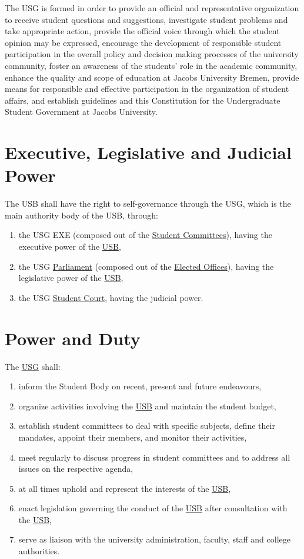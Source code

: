 The \ac{USG}\label{USGdef} is formed in order to provide an official and representative organization to receive student questions and suggestions, investigate student problems and take appropriate action, provide the official voice through which the student opinion may be expressed, encourage the development of responsible student participation in the overall policy and decision making processes of the university community, foster an awareness of the students' role in the academic community, enhance the quality and scope of education at Jacobs University Bremen, provide means for responsible and effective participation in the organization of student affairs, and establish guidelines and this Constitution for the Undergraduate Student Government at Jacobs University.


\section{Executive, Legislative and Judicial Power} 
The \acf{USB}\label{USBdef} shall have the right to self-governance through the \acf{USG}, which is the main authority body of the USB, through:
\begin{enumerate}
    \item the USG \acl{EXE} (composed out of the \hyperref[USGstructure]{Student Committees}), having the executive power of the \hyperref[studentbody]{USB},
    \item the USG \hyperref[USGParliamentDef]{Parliament} \label{USGParliament} (composed out of the \hyperref[ElectedOfficesDef]{Elected Offices}), having the legislative power of the \hyperref[studentbody]{USB},
    \item the USG \hyperref[StudentCourtDef]{Student Court}, having the judicial power.
\end{enumerate}


\section{Power and Duty}
The \hyperref[USGdef]{USG} shall: 
\begin{enumerate}
\item inform the Student Body on recent, present and future endeavours,
\item organize activities involving the \hyperref[studentbody]{USB} and maintain the student budget,
\item establish student committees to deal with specific subjects, define their mandates, appoint their members, and monitor their activities,
\item meet regularly to discuss progress in student committees and to address all issues on the respective agenda,
\item at all times uphold and represent the interests of the \hyperref[studentbody]{USB},
\item enact legislation governing the conduct of the \hyperref[studentbody]{USB} after consultation with the \hyperref[studentbody]{USB},
\item serve as liaison with the university administration, faculty, staff and college authorities.
\end{enumerate}

